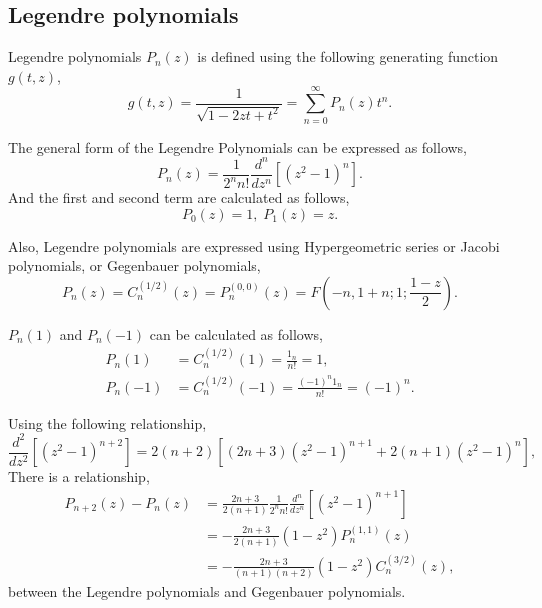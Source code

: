 \documentclass[12pt]{article}
\newcommand{\bibun}[2]{\frac{d {#1}}{d {#2}}}
\begin{document}
\subsection{Legendre polynomials}
Legendre polynomials $P_n(z)$ is defined using the following generating function $g(t,z)$,
\begin{equation}
 g(t,z) = \frac{1}{\sqrt{1 - 2zt + t^2}} = \sum_{n=0}^{\infty} P_n(z) t^n.
\end{equation}

The general form of the Legendre Polynomials can be expressed as follows,
\begin{equation}
 P_n (z) = \frac{1}{2^n n!} \frac{d^n}{dz^n}\left[ (z^2 - 1)^n \right].
\end{equation}
And the first and second term are calculated as follows,
\begin{equation}
 P_0(z) = 1, \; P_1(z) = z.
\end{equation}

Also, Legendre polynomials are expressed using Hypergeometric series or Jacobi polynomials, or Gegenbauer polynomials,
\begin{equation}
 P_n(z) = C^{(1/2)}_n(z) = P^{(0, 0)}_n (z) = F\left(-n, 1+n; 1; \frac{1-z}{2}\right).
\end{equation}

$P_n(1)$ and $P_n(-1)$ can be calculated as follows,
\begin{align}
 P_n(1) &= C^{(1/2)}_n(1) = \frac{1_n}{n!} = 1,\label{legendre1}\\
 P_n(-1) &= C^{(1/2)}_n(-1) = \frac{(-1)^n 1_n}{n!} = (-1)^n.\label{legendre-1}
\end{align}


Using the following relationship,
\begin{equation}
 \frac{d^2}{dz^2}\left[ (z^2 - 1)^{n+2} \right] = 2(n+2)\left[ (2n+3) (z^2 - 1)^{n+1} + 2(n+1) (z^2 - 1)^n \right],
\end{equation}
There is a relationship,
\begin{align}
 P_{n+2}(z) - P_n(z) & = \frac{2n+3}{2(n+1)} \frac{1}{2^n n!} \frac{d^n}{dz^n}\left[ (z^2 - 1)^{n+1} \right]\nonumber\\
 & = -\frac{2n+3}{2(n+1)} (1-z^2) P^{(1,1)}_n(z)\nonumber\\
 & = -\frac{2n+3}{(n+1)(n+2)} (1-z^2) C^{(3/2)}_n(z),\label{gegen_legendre_relation}
\end{align}
between the Legendre polynomials and Gegenbauer polynomials.
\end{document}
